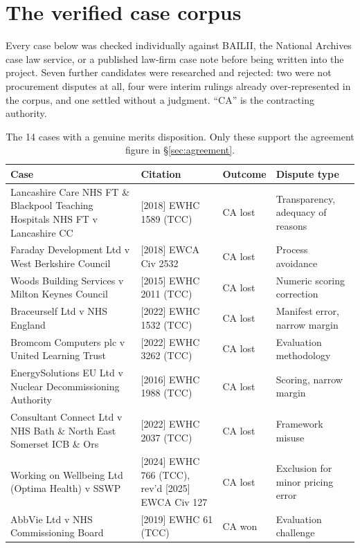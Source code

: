 \chapter{The verified case corpus}
\label{app:corpus}

Every case below was checked individually against BAILII, the National Archives
case law service, or a published law-firm case note before being written into the
project. Seven further candidates were researched and rejected: two were not
procurement disputes at all, four were interim rulings already over-represented in
the corpus, and one settled without a judgment. ``CA'' is the contracting
authority.

\begin{table}[htbp]
\centering
\scriptsize
\caption[Merits-disposition cases]{The 14 cases with a genuine merits disposition.
Only these support the agreement figure in \S\ref{sec:agreement}.}
\label{tab:corpus}
\begin{tabular}{@{}p{5.3cm}p{3.0cm}p{1.3cm}p{3.5cm}@{}}
\toprule
\textbf{Case} & \textbf{Citation} & \textbf{Outcome} & \textbf{Dispute type} \\
\midrule
Lancashire Care NHS FT \& Blackpool Teaching Hospitals NHS FT v Lancashire CC &
  [2018] EWHC 1589 (TCC) & CA lost & Transparency, adequacy of reasons \\
Faraday Development Ltd v West Berkshire Council &
  [2018] EWCA Civ 2532 & CA lost & Process avoidance \\
Woods Building Services v Milton Keynes Council &
  [2015] EWHC 2011 (TCC) & CA lost & Numeric scoring correction \\
Braceurself Ltd v NHS England &
  [2022] EWHC 1532 (TCC) & CA lost & Manifest error, narrow margin \\
Bromcom Computers plc v United Learning Trust &
  [2022] EWHC 3262 (TCC) & CA lost & Evaluation methodology \\
EnergySolutions EU Ltd v Nuclear Decommissioning Authority &
  [2016] EWHC 1988 (TCC) & CA lost & Scoring, narrow margin \\
Consultant Connect Ltd v NHS Bath \& North East Somerset ICB \& Ors &
  [2022] EWHC 2037 (TCC) & CA lost & Framework misuse \\
Working on Wellbeing Ltd (Optima Health) v SSWP &
  [2024] EWHC 766 (TCC), rev'd [2025] EWCA Civ 127 & CA lost & Exclusion for minor pricing error \\
AbbVie Ltd v NHS Commissioning Board &
  [2019] EWHC 61 (TCC) & CA won & Evaluation challenge \\

\end{tabular}
\end{table}
